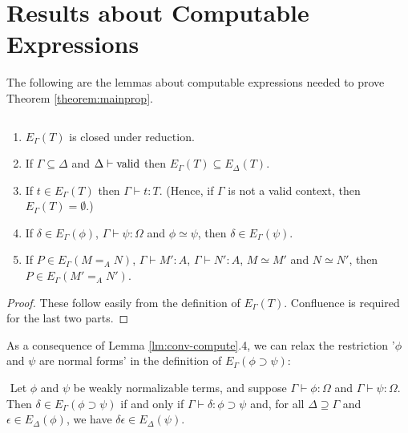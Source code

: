 \begin{frame}

\end{frame}

\appendix

\section{Results about Computable Expressions}

The following are the lemmas about computable expressions needed to prove Theorem \ref{theorem:mainprop}.

\begin{lm}$ $
\label{lm:conv-compute}
\begin{enumerate}
\item
$E_\Gamma(T)$ is closed under reduction.
\item
If $\Gamma \subseteq \Delta$ and $\Delta \vdash \mathrm{valid}$ then $E_\Gamma(T) \subseteq E_\Delta(T)$.
\item
If $t \in E_\Gamma(T)$ then $\Gamma \vdash t : T$.  (Hence, if $\Gamma$ is not a valid context, then $E_\Gamma(T) = \emptyset$.)
\item
If $\delta \in E_\Gamma(\phi)$, $\Gamma \vdash \psi : \Omega$ and $\phi \simeq \psi$, then $\delta \in E_\Gamma(\psi)$.
\item
If $P \in E_\Gamma(M =_A N)$, $\Gamma \vdash M' : A$, $\Gamma \vdash N' : A$, $M \simeq M'$ and $N \simeq N'$,
then $P \in E_\Gamma(M' =_A N')$.
\end{enumerate}
\end{lm}

\begin{proof}
These follow easily from the definition of $E_\Gamma(T)$.  Confluence is required for the last two parts.
\end{proof}

As a consequence of Lemma \ref{lm:conv-compute}.4, we can relax the restriction '$\phi$ and $\psi$ are normal forms' in the definition of $E_\Gamma(\phi \supset \psi)$:
\begin{lm}$ $
Let $\phi$ and $\psi$ be weakly normalizable terms, and suppose $\Gamma \vdash \phi : \Omega$ and $\Gamma \vdash \psi : \Omega$.  Then $\delta \in E_\Gamma(\phi \supset \psi)$ if and only if $\Gamma \vdash \delta : \phi \supset \psi$
and, for all $\Delta \supseteq \Gamma$ and $\epsilon \in E_\Delta(\phi)$, we have $\delta \epsilon \in E_\Delta(\psi)$.
\end{lm}


